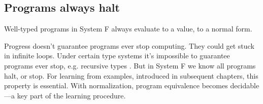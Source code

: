 \subsection{Programs always halt}
\begin{theorem}
Well-typed programs in System F always evaluate to a value, to a normal form.
\label{normalization-evaluation}
\end{theorem}

Progress doesn't guarantee programs ever stop computing. They could get stuck in infinite loops. Under certain type systems it's impossible to guarantee programs ever stop, e.g. recursive types \cite{pierce2002types}. But in System F we know all programs halt, or stop. For learning from examples, introduced in subsequent chapters, this property is essential. With normalization, program equivalence becomes decidable---a key part of the learning procedure. 

